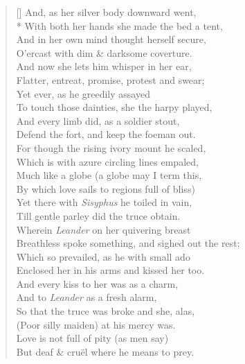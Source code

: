 \documentclass[MAIN]{subfiles}
\begin{document}
\settowidth{\versewidth}{Breathless spoke something, and sighed out the rest;}
\begin{verse}[\versewidth]
And, as her silver body downward went,\\*
With both her hands she made the bed a tent,\\
And in her own mind thought herself secure,\\
O'ercast with dim \& darksome coverture.\\
And now she lets him whisper in her ear,\\
Flatter, entreat, promise, protest and swear;\\
Yet ever, as he greedily assayed\\
To touch those dainties, she the harpy played,\\
And every limb did, as a soldier stout,\\
Defend the fort, and keep the foeman out.\\
For though the rising ivory mount he scaled,\\
Which is with azure circling lines empaled,\\
Much like a globe (a globe may I term this,\\
By which love sails to regions full of bliss)\\
Yet there with \emph{Sisyphus} he toiled in vain,\\
Till gentle parley did the truce obtain.\\
Wherein \emph{Leander} on her quivering breast\\
Breathless spoke something, and sighed out the rest;\\
Which so prevailed, as he with small ado\\
Enclosed her in his arms and kissed her too.\\
And every kiss to her was as a charm,\\
And to \emph{Leander} as a fresh alarm,\\
So that the truce was broke and she, alas,\\
(Poor silly maiden) at his mercy was.\\
Love is not full of pity (as men say)\\
But deaf \& cru\"el where he means to prey.\\

\end{verse}
\end{document}
